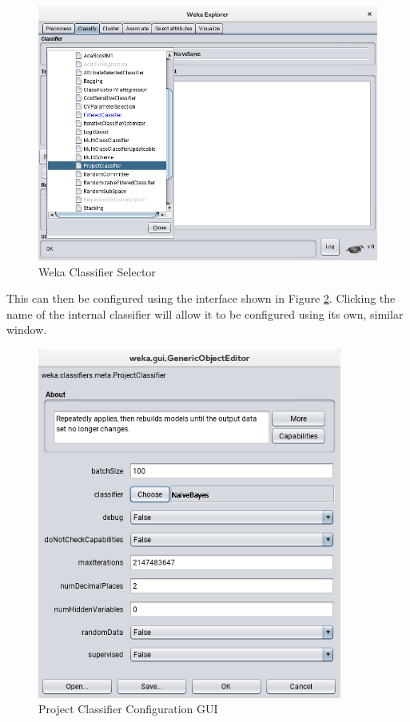 \begin{figure}[ht!]
\centering
    \includegraphics[width=120mm]{explore_classify.png}
\caption{Weka Classifier Selector \label{explore_classify}}
\end{figure}

This can then be configured using the interface shown in Figure \ref{project_classifier_gui}. Clicking the name of the internal classifier will allow it to be configured using its own, similar window.

\begin{figure}[ht!]
\centering
    \includegraphics[width=100mm]{project_classifier_interface.png}
\caption{Project Classifier Configuration GUI \label{project_classifier_gui}}
\end{figure}


